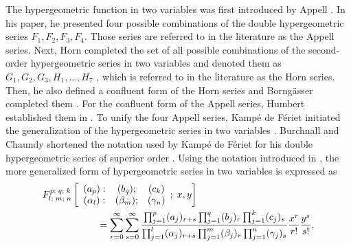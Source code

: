 The hypergeometric function in two variables was first introduced by Appell \cite{appell1880classe}. In his paper, he presented four possible combinations of the double hypergeometric series $F_1, F_2, F_3, F_4$. Those series are referred to in the literature as the Appell series. Next, Horn completed the set of all possible combinations of the second-order hypergeometric series in two variables and denoted them as $G_1, G_2, G_3, H_1, \dots, H_7$ \cite{horn1931hypergeometrische}, which is referred to in the literature as the Horn series. Then, he also defined a confluent form of the Horn series and Borngässer completed them \cite{borngasser1933uber}. For the confluent form of the Appell series, Humbert established them in \cite{humbert1922ix}. %
To unify the four Appell series, Kampé de Fériet initiated the generalization of the hypergeometric series in two variables \cite{appell1926fonctions}. Burchnall and Chaundy shortened the notation used by Kampé de Fériet for his double hypergeometric series of superior order \cite{burchnall1941expansions}. Using the notation introduced in \cite{srivastava1976integral}, the more generalized form of hypergeometric series in two variables is expressed as 
\begin{align}
\begin{split} \label{kampein}
    & F^{p:\;q;\;k}_{l:\;m;\;n}\left[\begin{array}{ccc}
         (a_p):& (b_q); & (c_k)  \\
         (\alpha_l):& (\beta_m); & (\gamma_n) 
    \end{array};\;  x,y\right] 
    \\& \hspace{20mm} =  \sum_{r=0}^{\infty}\sum_{s=0}^{\infty} \frac{\prod_{j=1}^p (a_j)_{r+s} \prod_{j=1}^q (b_j)_r \prod_{j=1}^k (c_j)_s}{\prod_{j=1}^l (\alpha_j)_{r+s} \prod_{j=1}^m (\beta_j)_r \prod_{j=1}^n (\gamma_j)_s} \frac{x^r}{r!}\frac{y^s}{s!},
\end{split}
\end{align}
